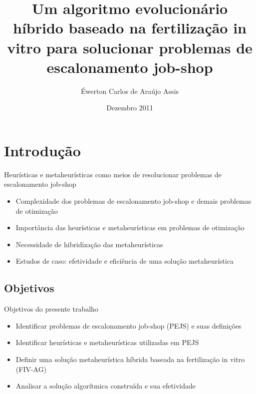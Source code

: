 \documentclass{beamer}
\title{Um algoritmo evolucion\'{a}rio h\'{i}brido baseado na fertiliza\c{c}\~{a}o in vitro para solucionar problemas de escalonamento job-shop}
\author{\'{E}werton Carlos de Ara\'{u}jo Assis}
\date{Dezembro 2011}
\begin{document}
\begin{frame}[plain] 
  \titlepage
\end{frame}

\begin{frame}
  \tableofcontents[sections={1-3}]
\end{frame}

\begin{frame}
  \tableofcontents[sections={4-6}]
\end{frame}

\begin{frame}
  \tableofcontents[sections={7-9}]
\end{frame}

\section{Introdução}
\begin{frame}{Heur\'{i}sticas e metaheur\'{i}sticas como meios de resolucionar problemas de escalonamento job-shop}
\begin{itemize}
\item<1-> Complexidade dos problemas de escalonamento job-shop e demais problemas de otimiza\c{c}\~{a}o
\item<2-> Import\^{a}ncia das heur\'{i}sticas e metaheur\'{i}sticas em problemas de otimiza\c{c}\~{a}o
\item<3-> Necessidade de hibridiza\c{c}\~{a}o das metaheur\'{i}sticas
\item<4-> Estudos de caso: efetividade e efici\^{e}ncia de uma solu\c{c}\~{a}o metaheur\'{i}stica
\end{itemize}
\end{frame}

\subsection{Objetivos}
\begin{frame}{Objetivos do presente trabalho}
\begin{itemize}
\item<1-> Identificar problemas de escalonamento job-shop (PEJS) e suas defini\c{c}\~{o}es
\item<2-> Identificar heur\'{i}sticas e metaheur\'{i}sticas utilizadas em PEJS
\item<3-> Definir uma solu\c{c}\~{a}o metaheur\'{i}stica h\'{i}brida baseada na fertiliza\c{c}\~{a}o in vitro (FIV-AG)
\item<4-> Analisar a solu\c{c}\~{a}o algor\'{i}tmica constru\'{i}da e sua efetividade
\end{itemize}
\end{frame}
\end{document}
